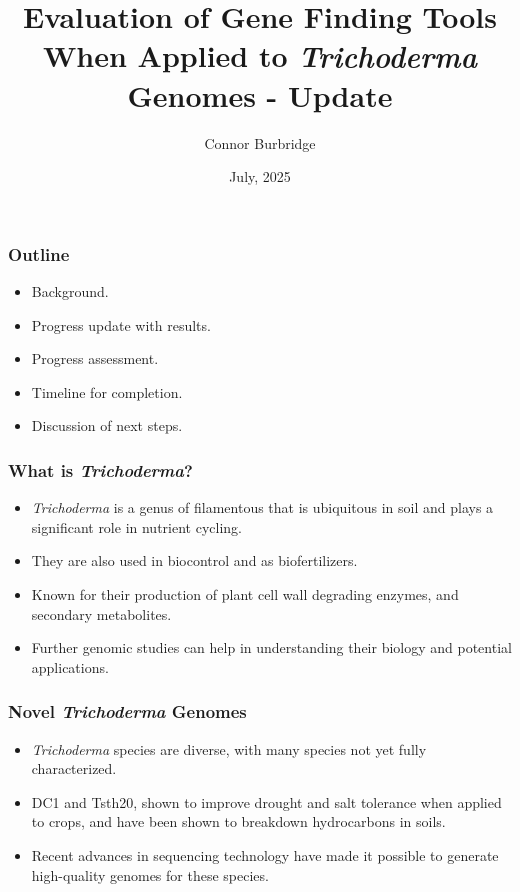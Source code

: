 \documentclass[t]{beamer}
\title{Evaluation of Gene Finding Tools When Applied to \textit{Trichoderma} Genomes - Update}
\date{July, 2025}
\author{Connor Burbridge}
\institute{Department of Computer Science}
\begin{document}
\begin{frame}
	\titlepage
\end{frame}

\begin{frame}
	\frametitle{Outline} 

	\begin{itemize}
		\item Background.
		\item Progress update with results.
		\item Progress assessment.
		\item Timeline for completion.	
		\item Discussion of next steps.
	\end{itemize}
\end{frame}



\begin{frame}
	\frametitle{What is \textit{Trichoderma}?}
	\begin{itemize}
		\item \textit{Trichoderma} is a genus of filamentous that is ubiquitous in soil and plays a significant role in nutrient cycling.
		\item They are also used in biocontrol and as biofertilizers.
		\item Known for their production of plant cell wall degrading enzymes, and secondary metabolites.
		\item Further genomic studies can help in understanding their biology and potential applications.
	\end{itemize}
\end{frame}

\begin{frame}
	\frametitle{Novel \textit{Trichoderma} Genomes}
	\begin{itemize}
		\item \textit{Trichoderma} species are diverse, with many species not yet fully characterized.
		\item DC1 and Tsth20, shown to improve drought and salt tolerance when applied to crops, and have been shown to breakdown hydrocarbons in soils.
		\item Recent advances in sequencing technology have made it possible to generate high-quality genomes for these species.
	\end{itemize}
\end{frame}
\end{document}
